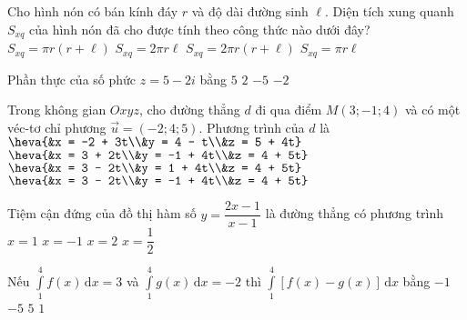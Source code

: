 \begin{ex}%
Cho hình nón có bán kính đáy $r$ và độ dài đường sinh $\ell$. Diện tích xung quanh $S_{xq}$ của hình nón đã cho được tính theo công thức nào dưới đây?
\choice
{$S_{xq} = \pi r(r + \ell)$}
{$S_{xq} = 2 \pi r\ell$}
{$S_{xq} = 2 \pi r(r +\ell)$}
{\True $S_{xq} = \pi r\ell$}
\end{ex}

\begin{ex}%
Phần thực của số phức $z = 5 - 2i$ bằng
\choice
{\True $5$}
{$2$}
{$-5$}
{$-2$}
\end{ex}

\begin{ex}%
Trong không gian $Oxyz$, cho đường thẳng $d$ đi qua điểm $M(3; -1; 4)$ và có một véc-tơ chỉ phương $\vec{u} = (-2; 4; 5)$. Phương trình của $d$ là
\choice
{$\heva{&x = -2 + 3t\\&y = 4 - t\\&z = 5 + 4t}$}
{$\heva{&x = 3 + 2t\\&y = -1 + 4t\\&z = 4 + 5t}$}
{$\heva{&x = 3 - 2t\\&y = 1 + 4t\\&z = 4 + 5t}$}
{\True $\heva{&x = 3 - 2t\\&y = -1 + 4t\\&z = 4 + 5t}$}
\end{ex}

\begin{ex}%
Tiệm cận đứng của đồ thị hàm số $y = \dfrac{2x - 1}{x - 1}$ là đường thẳng có phương trình
\choice
{\True $x = 1$}
{$x = -1$}
{$x = 2$}
{$x = \dfrac{1}{2}$}
\end{ex}

\begin{ex}%
Nếu $\displaystyle\int\limits_1^4 f(x) \mathrm{\,d} x=3$ và $\displaystyle\int\limits_1^4 g(x) \mathrm{\,d}x = -2$ thì $\displaystyle\int\limits_1^4[f(x)-g(x)] \mathrm{\,d}x$ bằng
\choice
{$-1$}
{$-5$}
{\True $5$}
{$1$}
\end{ex}

